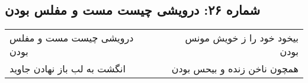\begin{center}
\section*{شماره ۲۶: درویشی چیست مست و مفلس بودن}
\label{sec:026}
\begin{longtable}{l p{0.5cm} r}
درویشی چیست مست و مفلس بودن
&&
بیخود خود را ز خویش مونس بودن
\\
انگشت به لب باز نهادن جاوید
&&
همچون ناخن زنده و بیحس بودن
\\
\end{longtable}
\end{center}
